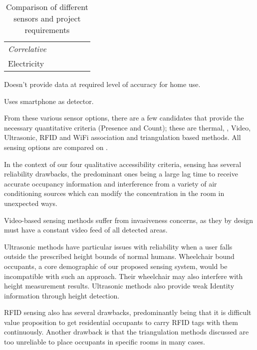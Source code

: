 \documentclass[../thesis/thesis.tex]{subfiles}
\begin{document}
\begin{table}
\begin{threeparttable}
\begin{tabularx}{\textwidth}{|l|l|l||l||l|l|}
\hspace{3mm}\textit{Correlative} 	& & & & & \\
\hspace{8mm}Electricity 		& \cmark\ssup & \xmark & \cmark & & \\

\cline{1-6}
\end{tabularx}
\begin{tablenotes}
\item \ssup  Doesn't provide data at required level of accuracy for home use.
\item \tsup  Uses smartphone as detector.
\end{tablenotes}
\end{threeparttable}
\caption{Comparison of different sensors and project requirements}
\label{tab:litreview:taxonomycomp}
\end{table}

From these various sensor options, there are a few candidates that provide the necessary quantitative criteria (Presence and Count); these are thermal, \cdi, Video, Ultrasonic, RFID and WiFi association and triangulation based methods. All sensing options are compared on .

In the context of our four qualitative accessibility criteria, \cdi sensing has several reliability drawbacks, the predominant ones being a large lag time to receive accurate occupancy information and interference from a variety of air conditioning sources which can modify the \cdi concentration in the room in unexpected ways.

Video-based sensing methods suffer from invasiveness concerns, as they by design must have a constant video feed of all detected areas.

Ultrasonic methods have particular issues with reliability when a user falls outside the prescribed height bounds of normal humans. Wheelchair bound occupants, a core demographic of our proposed sensing system, would be incompatible with such an approach. Their wheelchair may also interfere with height measurement results. Ultrasonic methods also provide weak Identity information through height detection.

RFID sensing also has several drawbacks, predominantly being that it is difficult value proposition to get residential occupants to carry RFID tags with them continuously. Another drawback is that the triangulation methods discussed are too unreliable to place occupants in specific rooms in many cases.
\end{document}
